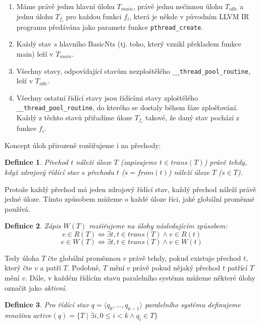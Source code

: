 \documentclass[12pt]{fithesis2}
\newtheorem{definition}{Definice}
\newcommand{\tuple}[1]{\langle #1 \rangle}
\newcommand{\suchthat}{\mid}
\begin{document}
\begin{enumerate}
\item Máme právě jednu hlavní úlohu $T_{\mathit{main}}$, právě jednu nečinnou úlohu $T_{\mathit{idle}}$ a jednu úlohu $T_{f_i}$ pro každou funkci $f_i$, která je někde v původním LLVM IR programu předávána jako parametr funkce \texttt{pthread\_create}.
\item Každý stav $s$ hlavního BasicNts (tj. toho, který vznikl překladem funkce main) leží v $T_{\mathit{main}}$.
\item Všechny stavy, odpovídající stavům nezploštělého \texttt{\_\_thread\_pool\_routine}, leží v $T_{\mathit{idle}}$.
\item Všechny ostatní řídící stavy jsou řídícími stavy zploštělého \texttt{\_\_thread\_pool\_routine}, do kterého se dostaly během fáze zplošťování. Každý z těchto stavů přiřadíme úloze $T_{f_i}$ takové, že daný stav pochází z funkce $f_i$.
\end{enumerate}


Koncept úloh přirozeně rozšiřujeme i na přechody:
\begin{definition}
Přechod $t$ náleží úloze $T$ (zapisujeme $t \in \mathit{trans}(T)$) právě tehdy, když zdrojový řídící stav $s$ přechodu $t$ ($s = \mathit{from}(t)$) náleží úloze $T$ ($s \in T$).
\end{definition}
Protože každý přechod má jeden zdrojový řídící stav, každý přechod náleží právě jedné úloze. Tímto způsobem můžeme o každé úloze říci, jaké globální proměnné používá.

\begin{definition}
Zápis $W(T)$ rozšiřujeme na úlohy následujícím způsobem:
\begin{equation*}
v \in R(T) \Leftrightarrow \exists t, t \in \mathit{trans}(T) \land v \in R(t)
\end{equation*}
\begin{equation*}
v \in W(T) \Leftrightarrow \exists t, t \in \mathit{trans}(T) \land v \in W(t)
\end{equation*}
\end{definition}
Tedy úloha $T$ čte globální proměnnou $v$ právě tehdy, pokud existuje přechod $t$, který čte $v$ a patří $T$. Podobně, $T$ mění $v$ právě pokud nějaký přechod $t$ patřící $T$ mění $v$.
Dále, v každém řídícím stavu paralelního systému můžeme některé úlohy označit jako \textit{aktivní}.
\begin{definition}
Pro řídící stav $q = \tuple{q_0, \ldots, q_{k-1}}$ paralelního systému definujeme množinu $\mathit{active}(q) = \{ T \suchthat \exists i, 0 \leq i < k \land q_i \in T \}$
\end{definition}
\end{document}
